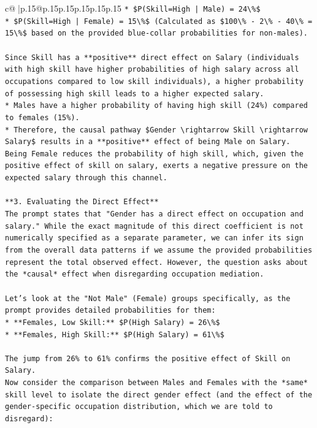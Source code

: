 \documentclass{article}
\begin{document}
{\begin{supertabular}{c@{$\;$}|p{.15\linewidth}@{}p{.15\linewidth}p{.15\linewidth}p{.15\linewidth}p{.15\linewidth}p{.15\linewidth}}
{{{\texttt{*   \$P(Skill=High | Male) = 24\textbackslash{}\%\$} \\
\texttt{*   \$P(Skill=High | Female) = 15\textbackslash{}\%\$ (Calculated as \$100\textbackslash{}\% {-} 2\textbackslash{}\% {-} 40\textbackslash{}\% = 15\textbackslash{}\%\$ based on the provided blue{-}collar probabilities for non{-}males).} \\
\\ 
\texttt{Since Skill has a **positive** direct effect on Salary (individuals with high skill have higher probabilities of high salary across all occupations compared to low skill individuals), a higher probability of possessing high skill leads to a higher expected salary.} \\
\texttt{*   Males have a higher probability of having high skill (24\%) compared to females (15\%).} \\
\texttt{*   Therefore, the causal pathway \$Gender \textbackslash{}rightarrow Skill \textbackslash{}rightarrow Salary\$ results in a **positive** effect of being Male on Salary. Being Female reduces the probability of high skill, which, given the positive effect of skill on salary, exerts a negative pressure on the expected salary through this channel.} \\
\\ 
\texttt{**3. Evaluating the Direct Effect**} \\
\texttt{The prompt states that "Gender has a direct effect on occupation and salary." While the exact magnitude of this direct coefficient is not numerically specified as a separate parameter, we can infer its sign from the overall data patterns if we assume the provided probabilities represent the total observed effect. However, the question asks about the *causal* effect when disregarding occupation mediation.} \\
\\ 
\texttt{Let's look at the "Not Male" (Female) groups specifically, as the prompt provides detailed probabilities for them:} \\
\texttt{*   **Females, Low Skill:** \$P(High Salary) = 26\textbackslash{}\%\$} \\
\texttt{*   **Females, High Skill:** \$P(High Salary) = 61\textbackslash{}\%\$} \\
\\ 
\texttt{The jump from 26\% to 61\% confirms the positive effect of Skill on Salary.} \\
\texttt{Now consider the comparison between Males and Females with the *same* skill level to isolate the direct gender effect (and the effect of the gender{-}specific occupation distribution, which we are told to disregard):} \\
}}}
\end{supertabular}}
\end{document}
